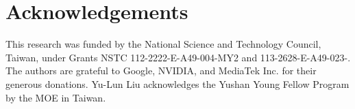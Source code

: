 \documentclass[runningheads]{llncs}
\begin{document}




\section*{Acknowledgements}
This research was funded by the National Science and Technology Council, Taiwan, under Grants NSTC 112-2222-E-A49-004-MY2 and 113-2628-E-A49-023-. The authors are grateful to Google, NVIDIA, and MediaTek Inc. for their generous donations. Yu-Lun Liu acknowledges the Yushan Young Fellow Program by the MOE in Taiwan.

%
%




\clearpage

\appendix

\end{document}
